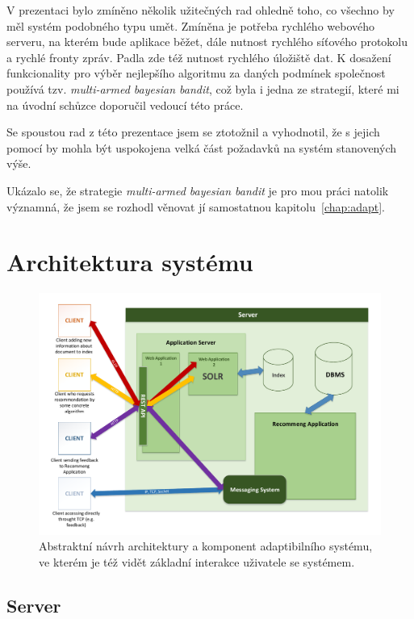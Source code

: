 \documentclass[thesis=M,czech]{FITthesis}[2014/05/07]
\begin{document}
V prezentaci bylo zmíněno několik užitečných rad ohledně toho, co všechno by měl systém podobného typu umět. Zmíněna je potřeba rychlého webového serveru, na kterém bude aplikace běžet, dále nutnost rychlého síťového protokolu a rychlé fronty zpráv. Padla zde též nutnost rychlého úložiště dat. K dosažení funkcionality pro výběr nejlepšího algoritmu za daných podmínek společnost používá tzv. \emph{multi-armed bayesian bandit}, což byla i jedna ze strategií, které mi na úvodní schůzce doporučil vedoucí této práce.

Se spoustou rad z této prezentace jsem se ztotožnil a vyhodnotil, že s jejich pomocí by mohla být uspokojena velká část požadavků na systém stanovených výše.

Ukázalo se, že strategie \emph{multi-armed bayesian bandit} je pro mou práci natolik významná, že jsem se rozhodl věnovat jí samostatnou kapitolu~\ref{chap:adapt}.

\section{Architektura systému}

\begin{figure}\centering
	\includegraphics[width=1.0\textwidth]{obr/DIPLOMKA_env.pdf}
 	\caption[Abstraktní návrh architektury a komponent adaptibilního systému]{Abstraktní návrh architektury a komponent adaptibilního systému, ve kterém je též vidět základní interakce uživatele se systémem.}\label{fig:recommeng}
\end{figure}	

\subsection{Server}
\end{document}
